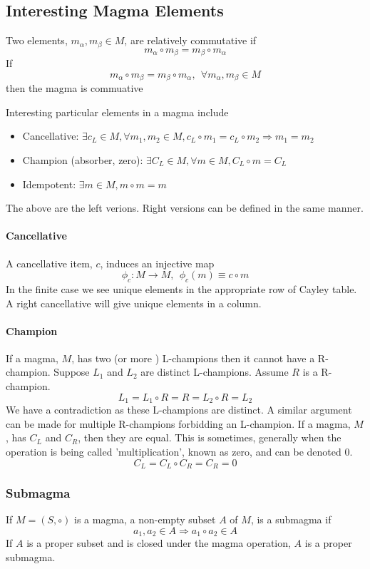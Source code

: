 \documentclass[a4paper]{scrartcl}
\begin{document}
\subsection{Interesting Magma Elements}

Two elements, $m_{\alpha}, m_{\beta}\in M$, are relatively commutative if
$$m_{\alpha}\circ m_{\beta} = m_{\beta}\circ m_{\alpha}$$
If
$$m_{\alpha}\circ m_{\beta} = m_{\beta}\circ m_{\alpha},\ \  \forall m_{\alpha}, m_{\beta} \in M$$
then the magma is commuative


Interesting particular elements in a magma include
\begin{itemize}
\item{Cancellative: $\exists c_{L}\in M, \forall m_{1}, m_{2} \in M,  c_{L}\circ m_{1} = c_{L}\circ m_{2} \Rightarrow m_{1} = m_{2}$}
\item{Champion (absorber, zero): $\exists C_{L}\in M, \forall m\in M, C_{L}\circ m = C_{L}$}
\item{Idempotent: $\exists m\in M, m\circ m = m$} 
\end{itemize}
The above are the left verions. Right versions can be defined in the same manner. \\
\paragraph{Cancellative} A cancellative item, $c$, induces an injective map
$$\phi_{c}\colon M \rightarrow M,\ \  \phi_{c}(m)\equiv c\circ m $$
In the finite case we see unique elements in the appropriate row of Cayley table. A right cancellative will give unique elements in a column.
\paragraph{Champion}
If a magma, $M$, has two (or more ) L-champions then it cannot have a R-champion.  Suppose $L_{1}$ and $L_{2}$ are distinct L-champions. Assume $R$ is a R-champion.
$$L_{1} = L_{1} \circ R = R = L_{2} \circ R = L_{2}$$
We have a contradiction as these L-champions are distinct.  A similar argument can be made for multiple R-champions forbidding an L-champion. 
If a magma, $M$, has $C_{L}$ and $C_{R}$, then they are equal. This is sometimes, generally when the operation is being called 'multiplication', known as zero, and can be denoted $0$. 
$$C_{L} = C_{L} \circ C_{R} = C_{R} = 0$$





\subsubsection{Submagma}
If $M = (S,\circ)$ is a magma, a non-empty subset $A$ of $M$, is a submagma if 
$$a_{1},a_{2}\in A\Rightarrow a_{1}\circ a_{2}\in A$$ 
If $A$ is a proper subset and is closed under the magma operation, $A$ is a proper submagma.
\end{document}
